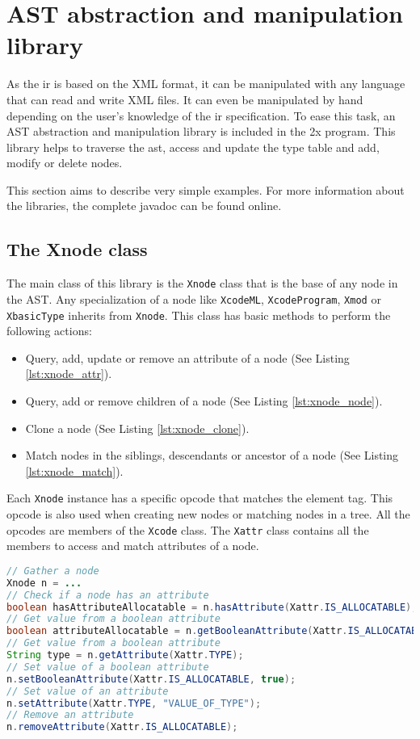\chapter{\xcodeml AST abstraction and manipulation library}
\label{chapter:astmanip}
As the \xcodeml \gls{ir} is based on the XML format, it can be manipulated with
any language that can read and write XML files. It can even be manipulated by
hand depending on the user's knowledge of the \xcodeml \gls{ir} specification.
To ease this task, an AST abstraction and manipulation library is included
in the \cx2x program. This library helps to traverse the \gls{ast}, access and
update the type table and add, modify or delete nodes.

This section aims to describe very simple examples. For more information about
the libraries, the complete javadoc\cite{claw:online, claw:javadoc} can be
found online.

\section{The Xnode class}
The main class of this library is the \lstinline|Xnode| class that is the base
of any node in the AST.
Any specialization of a node like \lstinline|XcodeML|,
\lstinline|XcodeProgram|, \lstinline|Xmod| or \lstinline|XbasicType| inherits
from \lstinline|Xnode|.
This class has basic methods to perform the following actions:
\begin{itemize}
\item Query, add, update or remove an attribute of a node
      (See Listing \ref{lst:xnode_attr}).
\item Query, add or remove children of a node (See Listing \ref{lst:xnode_node}).
\item Clone a node (See Listing \ref{lst:xnode_clone}).
\item Match nodes in the siblings, descendants or ancestor of a node
      (See Listing \ref{lst:xnode_match}).
\end{itemize}

Each \lstinline|Xnode| instance has a specific opcode that matches the \xcodemlf
element tag.
This opcode is also used when creating new nodes or matching nodes in a tree.
All the opcodes are members of the \lstinline|Xcode| class.
The \lstinline|Xattr| class contains all the members to access and match
attributes of a node.

\begin{lstlisting}[label=lst:xnode_attr, language=Java,
  caption=Xnode attribute methods]
// Gather a node
Xnode n = ...
// Check if a node has an attribute
boolean hasAttributeAllocatable = n.hasAttribute(Xattr.IS_ALLOCATABLE);
// Get value from a boolean attribute
boolean attributeAllocatable = n.getBooleanAttribute(Xattr.IS_ALLOCATABLE);
// Get value from a boolean attribute
String type = n.getAttribute(Xattr.TYPE);
// Set value of a boolean attribute
n.setBooleanAttribute(Xattr.IS_ALLOCATABLE, true);
// Set value of an attribute
n.setAttribute(Xattr.TYPE, "VALUE_OF_TYPE");
// Remove an attribute
n.removeAttribute(Xattr.IS_ALLOCATABLE);
\end{lstlisting}

